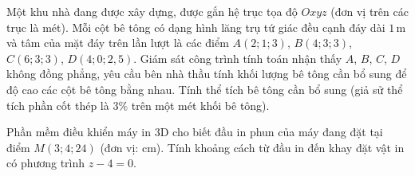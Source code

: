 \begin{bt}%
	Một khu nhà đang được xây dựng, được gắn hệ trục tọa độ $Oxyz$ (đơn vị trên các trục là mét). Mỗi cột bê tông có dạng hình lăng trụ tứ giác đều cạnh đáy dài $1$\,m và tâm của mặt đáy trên lần lượt là các điểm $A(2;1;3)$, $B(4;3;3)$, $C(6;3;3)$, $D(4;0;2{,}5)$. Giám sát công trình tính toán nhận thấy $A$, $B$, $C$,  $D$ không đồng phẳng, yêu cầu bên nhà thầu tính khối lượng bê tông cần bổ sung để độ cao các cột bê tông bằng nhau. Tính thể tích bê tông cần bổ sung (giả sử thể tích phần cốt thép là $3\%$ trên một mét khối bê tông).
\end{bt}

\begin{bt}%
	Phần mềm điều khiển máy in 3D cho biết đầu in phun  của máy đang đặt tại điểm $M(3;4;24)$ (đơn vị: cm). Tính khoảng cách từ đầu in đến khay đặt vật in có phương trình $z-4=0$.
\end{bt}

